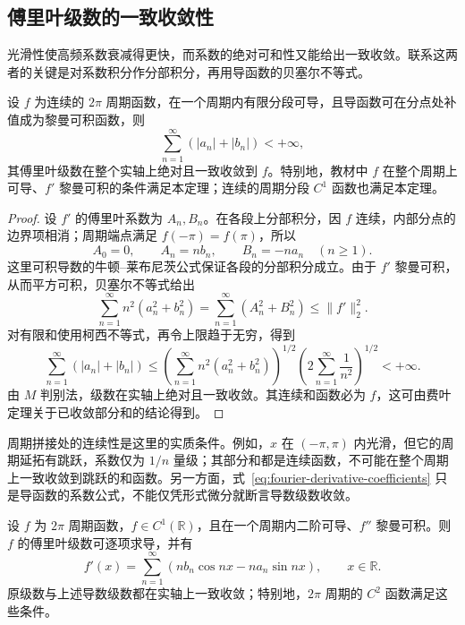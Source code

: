 \documentclass[UTF8,12pt,a4paper,fontset=fandol]{ctexbook}
\begin{document}
\subsection{傅里叶级数的一致收敛性}
\label{subsec:uniform-convergence-of-fourier-series}

光滑性使高频系数衰减得更快，而系数的绝对可和性又能给出一致收敛。联系这两者的关键是对系数积分作分部积分，再用导函数的贝塞尔不等式。

\begin{theorem}[一个一致收敛的充分条件]
\label{thm:fourier-absolute-uniform-convergence}
设 $f$ 为连续的 $2\pi$ 周期函数，在一个周期内有限分段可导，且导函数可在分点处补值成为黎曼可积函数，则
\begin{equation}
    \sum_{n=1}^\infty(|a_n|+|b_n|)<+\infty,
    \label{eq:fourier-absolute-coefficient-summability}
\end{equation}
其傅里叶级数在整个实轴上绝对且一致收敛到 $f$。特别地，教材中 $f$ 在整个周期上可导、$f'$ 黎曼可积的条件满足本定理；连续的周期分段 $C^1$ 函数也满足本定理。
\end{theorem}

\begin{proof}
设 $f'$ 的傅里叶系数为 $A_n,B_n$。在各段上分部积分，因 $f$ 连续，内部分点的边界项相消；周期端点满足 $f(-\pi)=f(\pi)$，所以
\begin{equation}
    A_0=0,\qquad A_n=nb_n,\qquad B_n=-na_n\quad(n\geq1).
    \label{eq:fourier-derivative-coefficients}
\end{equation}
这里可积导数的牛顿--莱布尼茨公式保证各段的分部积分成立。由于 $f'$ 黎曼可积，从而平方可积，贝塞尔不等式给出
\[
    \sum_{n=1}^\infty n^2(a_n^2+b_n^2)
       =\sum_{n=1}^\infty(A_n^2+B_n^2)\leq\|f'\|_2^2.
\]
对有限和使用柯西不等式，再令上限趋于无穷，得到
\[
    \sum_{n=1}^\infty(|a_n|+|b_n|)
       \leq\left(\sum_{n=1}^\infty n^2(a_n^2+b_n^2)\right)^{1/2}
          \left(2\sum_{n=1}^\infty\frac1{n^2}\right)^{1/2}<+\infty.
\]
由 $M$ 判别法，级数在实轴上绝对且一致收敛。其连续和函数必为 $f$，这可由费叶定理关于已收敛部分和的结论得到。
\end{proof}

周期拼接处的连续性是这里的实质条件。例如，$x$ 在 $(-\pi,\pi)$ 内光滑，但它的周期延拓有跳跃，系数仅为 $1/n$ 量级；其部分和都是连续函数，不可能在整个周期上一致收敛到跳跃的和函数。另一方面，式~\eqref{eq:fourier-derivative-coefficients} 只是导函数的系数公式，不能仅凭形式微分就断言导数级数收敛。

\begin{theorem}[傅里叶级数的逐项求导]
\label{thm:fourier-termwise-differentiation}
设 $f$ 为 $2\pi$ 周期函数，$f\in C^1(\mathbb R)$，且在一个周期内二阶可导、$f''$ 黎曼可积。则 $f$ 的傅里叶级数可逐项求导，并有
\begin{equation}
    f'(x)=\sum_{n=1}^\infty
                       (nb_n\cos nx-na_n\sin nx),
    \qquad x\in\mathbb R.
    \label{eq:fourier-termwise-differentiation}
\end{equation}
原级数与上述导数级数都在实轴上一致收敛；特别地，$2\pi$ 周期的 $C^2$ 函数满足这些条件。
\end{theorem}
\end{document}
